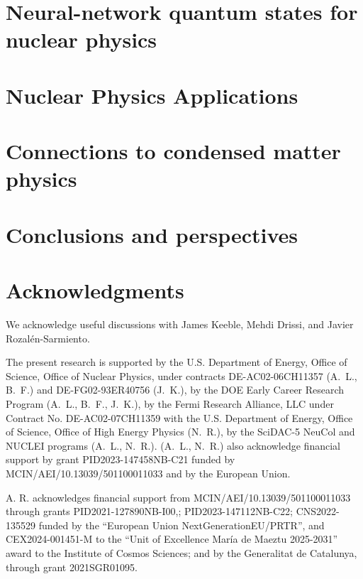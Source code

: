 \newpage
\section{Neural-network quantum states for nuclear physics}
\label{sec:nqs}

   
\newpage
\section{Nuclear Physics Applications}

\label{sec:applications}

\newpage
\section{Connections to condensed matter physics}
\label{sub:condensed_matter} 



\newpage
\section{Conclusions and perspectives}
\label{sec:conclusions}



\newpage
\section*{Acknowledgments}
We acknowledge useful discussions with James Keeble, Mehdi Drissi, and Javier Rozalén-Sarmiento.

The present research is supported by the U.S. Department of Energy, Office of Science, Office of Nuclear Physics, under contracts DE-AC02-06CH11357 (A.~L., B.~F.) and DE-FG02-93ER40756 (J.~K.), by the DOE Early Career Research Program (A.~L., B.~F., J.~K.), by the Fermi Research Alliance, LLC under Contract No. DE-AC02-07CH11359 with the U.S. Department of Energy, Office of Science, Office of High Energy Physics (N.~R.), by the SciDAC-5 NeuCol and NUCLEI programs (A.~L., N.~R.). (A.~L., N.~R.) also acknowledge financial support by grant PID2023-147458NB-C21 funded by MCIN/AEI/10.13039/501100011033 and by the European Union. 

A. R. acknowledges financial support from MCIN/AEI/10.13039/501100011033 through grants PID2021-127890NB-I00,; PID2023-147112NB-C22; CNS2022-135529 funded by the “European Union NextGenerationEU/PRTR”, 
and CEX2024-001451-M  to the “Unit of Excellence Mar\'ia de Maeztu 2025-2031” award to the Institute of Cosmos Sciences; and by the Generalitat de Catalunya, through grant 2021SGR01095. 

